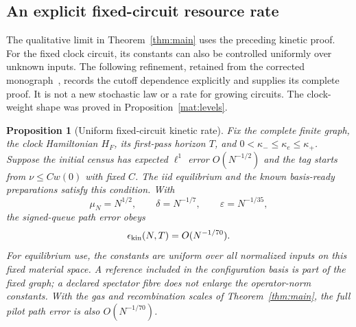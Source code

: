 \documentclass[11pt]{article}
\newtheorem{proposition}[theorem]{Proposition}
\theoremstyle{definition}\newtheorem{definition}[theorem]{Definition}
\theoremstyle{remark}\newtheorem{remark}[theorem]{Remark}
\begin{document}
\subsection{An explicit fixed-circuit resource rate}
\label{kin:uniformity-rate}
The qualitative limit in Theorem~\ref{thm:main} uses the preceding
kinetic proof. For the fixed clock circuit, its constants can also be
controlled uniformly over unknown inputs. The following refinement,
retained from the corrected monograph~\cite{Monograph}, records the
cutoff dependence explicitly and supplies its complete proof. It is not
a new stochastic law or a rate for growing circuits. The clock-weight
shape was proved in Proposition~\ref{mat:levels}.

\begin{proposition}[Uniform fixed-circuit kinetic rate]\label{kin:rate}
Fix the complete finite graph, the clock Hamiltonian $H_F$, its first-pass
horizon $T$, and $0<\kappa_-\le\kappa_e\le\kappa_+$.  Suppose the
initial census has expected $\ell^1$ error $O(N^{-1/2})$ and the tag starts
from $\nu\le Cw(0)$ with fixed $C$.  The iid equilibrium and the known
basis-ready preparations satisfy this condition.  With
\[
 \mu_N=N^{1/2},\qquad \delta=N^{-1/7},\qquad
 \varepsilon=N^{-1/35},
\]
the signed-queue path error obeys
\begin{equation}\label{kin:explicit-rate}
 \epsilon_{\rm kin}(N,T)=O(N^{-1/70}).
\end{equation}
For equilibrium use, the constants are uniform over all normalized inputs
on this fixed material space.  A reference included in the configuration
basis is part of the fixed graph; a declared spectator fibre does not
enlarge the operator-norm constants.  With the gas and recombination scales
of Theorem~\ref{thm:main}, the full pilot path error is also $O(N^{-1/70})$.
\end{proposition}
\end{document}
